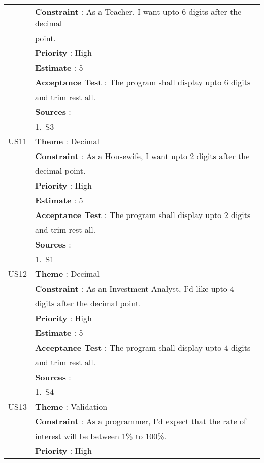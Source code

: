 \documentclass{article}
\begin{document}
\begin{longtable}{|| c || l ||}
         & \textbf{Constraint} : As a Teacher, I want upto 6 digits after the decimal \\
         & point. \\ 
         & \textbf{Priority} : High \\
         & \textbf{Estimate} : 5 \\
         & \textbf{Acceptance Test} : The program shall display upto 6 digits \\ 
         & and trim rest all. \\
         & \textbf{Sources} : \\
         & 1.~S3 \\
         \hline
         US11 & \textbf{Theme} : Decimal \\
         & \textbf{Constraint} : As a Housewife, I want upto 2 digits after the\\ 
         & decimal point. \\ 
         & \textbf{Priority} : High \\
         & \textbf{Estimate} : 5 \\
         & \textbf{Acceptance Test} : The program shall display upto 2 digits \\ 
         & and trim rest all. \\
         & \textbf{Sources} : \\
         & 1.~S1 \\
         \hline
         US12 & \textbf{Theme} : Decimal \\
         & \textbf{Constraint} : As an Investment Analyst, I'd like upto 4 \\ 
         & digits after the decimal point. \\
         & \textbf{Priority} : High \\
         & \textbf{Estimate} : 5 \\
         & \textbf{Acceptance Test} : The program shall display upto 4 digits \\ 
         & and trim rest all. \\
         & \textbf{Sources} : \\
         & 1.~S4 \\
         \hline
         \newpage
         \hline
         US13 & \textbf{Theme} : Validation \\
         & \textbf{Constraint} : As a programmer, I'd expect that the rate of \\ 
         & interest will be between 1\% to 100\%.\\ 
         & \textbf{Priority} : High \\

\end{longtable}
\end{document}
